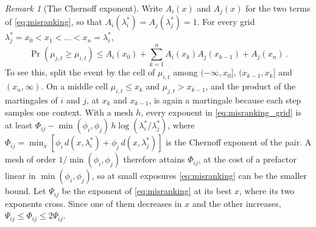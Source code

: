 \documentclass[twoside]{article}
\theoremstyle{plain}
\theoremstyle{definition}
\theoremstyle{remark}
\newtheorem{remark}{Remark}
\begin{document}
\begin{remark}[The Chernoff exponent]
    \label{rem:chernoff}
    Write $A_i(x)$ and $A_j(x)$ for the two terms of \eqref{eq:misranking}, so that $A_i(\lambda^{*}_i) = A_j(\lambda^{*}_j) = 1$.
    For every grid $\lambda^{*}_j = x_0 < x_1 < \dots < x_n = \lambda^{*}_i$,
    \begin{equation}
        \Pr(\mu_{j,t} \geq \mu_{i,t}) \leq A_i(x_0) + \sum_{k=1}^{n} A_i(x_k) A_j(x_{k-1}) + A_j(x_n) \,.
        \label{eq:misranking_grid}
    \end{equation}
    To see this, split the event by the cell of $\mu_{i,t}$ among $(-\infty, x_0]$, $(x_{k-1}, x_k]$ and $(x_n, \infty)$.
    On a middle cell $\mu_{i,t} \leq x_k$ and $\mu_{j,t} > x_{k-1}$, and the product of the martingales of $i$ and $j$, at $x_k$ and $x_{k-1}$, is again a martingale because each step samples one context.
    With a mesh $h$, every exponent in \eqref{eq:misranking_grid} is at least $\Phi_{ij} - \min(\phi_i, \phi_j) \, h \log(\lambda^{*}_i / \lambda^{*}_j)$, where $\Phi_{ij} = \min_x [\phi_i \, d(x, \lambda^{*}_i) + \phi_j \, d(x, \lambda^{*}_j)]$ is the Chernoff exponent of the pair.
    A mesh of order $1 / \min(\phi_i, \phi_j)$ therefore attains $\Phi_{ij}$, at the cost of a prefactor linear in $\min(\phi_i, \phi_j)$, so at small exposures \eqref{eq:misranking} can be the smaller bound.
    Let $\Psi_{ij}$ be the exponent of \eqref{eq:misranking} at its best $x$, where its two exponents cross.
    Since one of them decreases in $x$ and the other increases, $\Psi_{ij} \leq \Phi_{ij} \leq 2 \Psi_{ij}$.
\end{remark}
\end{document}
